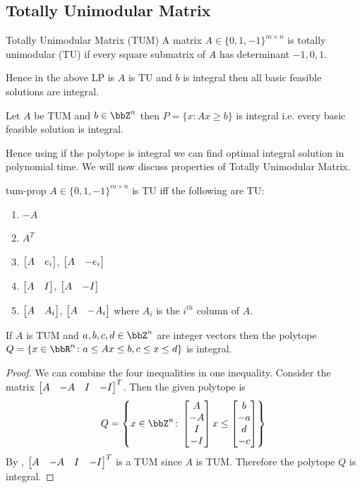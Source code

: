 \subsection{Totally Unimodular Matrix}
\begin{Definition}{Totally Unimodular Matrix (TUM)}{}
	A matrix $A\in \{0,1,-1\}^{m\times n}$ is totally unimodular (TU) if every square submatrix of $A$ has determinant $-1,0,1$.
\end{Definition}Hence in the above LP is $A$ is TU and $b$ is integral then all basic feasible solutions are integral.
\begin{lemma}{}{}
	Let $A$ be TUM and $b\in \bbZ^n$ then $P=\{x\colon Ax\geq b\}$ is integral i.e. every basic feasible solution is integral.
\end{lemma}

Hence using  if the polytope is integral we can find optimal integral solution in polynomial time. We will now discuss properties of Totally Unimodular Matrix.
\begin{lemma}{}{tum-prop}
	$A\in \{0,1,-1\}^{m\times n}$ is TU iff the following are TU:
	\begin{enumerate}[label=(\roman*)]
		\item $-A$
		\item $A^T$
		\item $\left[\begin{matrix}A & e_i\end{matrix}\right]$, $\left[\begin{matrix}A & -e_i\end{matrix}\right]$
		\item $\left[\begin{matrix}A& I\end{matrix}\right]$, $\left[\begin{matrix}A & -I\end{matrix}\right]$
		\item $\left[\begin{matrix}A & A_i\end{matrix}\right]$, $\left[\begin{matrix}A & -A_i\end{matrix}\right]$ where $A_i$ is the $i^{th}$ column of $A$. 
	\end{enumerate}
\end{lemma}


\begin{corolary}{}{}
	If $A$ is TUM and $a,b,c,d\in\bbZ^n$ are integer vectors then the polytope $Q=\{x\in \bbR^n\colon a\leq Ax\leq b, c\leq x\leq d\}$ is integral.
\end{corolary}
\begin{proof}
	We can combine the four inequalities in one inequality. Consider the matrix $\left[\begin{matrix}A & -A & I & -I\end{matrix}\right]^T$. Then the given polytope is $$Q=\lt\{x\in\bbZ^n\colon \mat{A \\ -A \\ I \\ -I} x\leq \mat{b \\-a\\ d \\ -c}\rt\}$$By , $\left[\begin{matrix}A & -A & I & -I\end{matrix}\right]^T$ is a TUM since $A$ is TUM. Therefore the polytope $Q$ is integral.
\end{proof}

